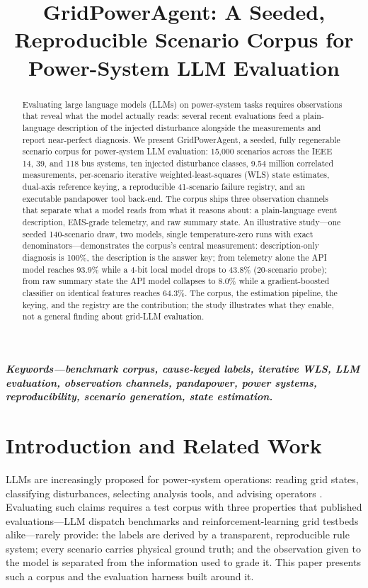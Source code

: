 \documentclass[conference]{IEEEtran}
\begin{document}
\title{GridPowerAgent: A Seeded, Reproducible Scenario Corpus for Power-System LLM Evaluation}

\author{}

\maketitle

\begin{abstract}
Evaluating large language models (LLMs) on power-system tasks requires observations that reveal what the model actually reads: several recent evaluations feed a plain-language description of the injected disturbance alongside the measurements and report near-perfect diagnosis. We present GridPowerAgent, a seeded, fully regenerable scenario corpus for power-system LLM evaluation: 15,000 scenarios across the IEEE 14, 39, and 118 bus systems, ten injected disturbance classes, 9.54 million correlated measurements, per-scenario iterative weighted-least-squares (WLS) state estimates, dual-axis reference keying, a reproducible 41-scenario failure registry, and an executable pandapower tool back-end. The corpus ships three observation channels that separate what a model reads from what it reasons about: a plain-language event description, EMS-grade telemetry, and raw summary state. An illustrative study---one seeded 140-scenario draw, two models, single temperature-zero runs with exact denominators---demonstrates the corpus's central measurement: description-only diagnosis is 100\%, the description is the answer key; from telemetry alone the API model reaches 93.9\% while a 4-bit local model drops to 43.8\% (20-scenario probe); from raw summary state the API model collapses to 8.0\% while a gradient-boosted classifier on identical features reaches 64.3\%. The corpus, the estimation pipeline, the keying, and the registry are the contribution; the study illustrates what they enable, not a general finding about grid-LLM evaluation.
\end{abstract}

\noindent\textbf{\textit{Keywords---benchmark corpus, cause-keyed labels,
iterative WLS, LLM evaluation, observation channels, pandapower, power
systems, reproducibility, scenario generation, state estimation.}}

\section{Introduction and Related Work}
LLMs are increasingly proposed for power-system operations: reading grid states, classifying disturbances, selecting analysis tools, and advising operators \cite{achiam2023gpt4,majumder2024joule,zhang2025gridagent,wen2025xgridagent}. Evaluating such claims requires a test corpus with three properties that published evaluations---LLM dispatch benchmarks \cite{zhou2024elecbench,cheng2025gaia} and reinforcement-learning grid testbeds \cite{marot2020l2rpn,donnot2020grid2op} alike---rarely provide: the labels are derived by a transparent, reproducible rule system; every scenario carries physical ground truth; and the observation given to the model is separated from the information used to grade it. This paper presents such a corpus and the evaluation harness built around it.
\end{document}
